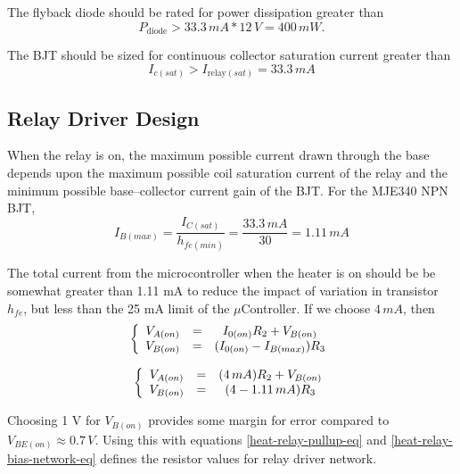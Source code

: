 \documentclass[10pt, twocolumn]{article}
\begin{document}
The flyback diode should be rated for power dissipation greater than
\begin{equation*}
P_{\textrm{diode}}>33.3\,mA*12\,V=400\,mW.
\end{equation*}

The BJT should be sized for continuous collector saturation current greater than
\begin{equation}
I_{c(sat)}>I_{\textrm{relay}(sat)}=33.3\,mA
\end{equation}

\subsection{Relay Driver Design}

When the relay is on, the maximum possible current drawn through the
base depends upon the maximum possible coil saturation current of the relay
and the minimum possible base--collector current gain of the BJT.
For the MJE340 NPN BJT,
\begin{equation*}
I_{B(max)}=\frac{I_{C(sat)}}{h_{fe(min)}}=\frac{33.3\,mA}{30}=1.11\,mA
\end{equation*}

The total current from the microcontroller when the heater is on should
be be somewhat greater than 1.11 mA to reduce the impact of variation in
transistor $h_{fe}$, but less than the 25 mA limit of the $\mu$Controller.
If we choose $4\,mA$, then
\begin{equation}
\left\{\begin{array}{c c c}
V_{A(on)}	&=&	I_{0(on)}R_{2}+V_{B(on)}	\\
V_{B(on)}	&=&	(I_{0(on)}-I_{B(max)})R_{3}	\\
\end{array}\right.
\label{heat-relay-bias-network-eq}
\end{equation}

\begin{equation*}
\left\{\begin{array}{c c c}
V_{A(on)}	&=&	(4\,mA)R_{2}+V_{B(on)}	\\
V_{B(on)}	&=&	(4-1.11\,mA)R_{3}	\\
\end{array}\right.
\end{equation*}

Choosing 1 V for $V_{B(on)}$ provides some margin for error compared to $V_{BE(on)}\approx 0.7\,V$.
Using this with equations
\ref{heat-relay-pullup-eq} and \ref{heat-relay-bias-network-eq}
defines the resistor values for relay driver network.
\end{document}
